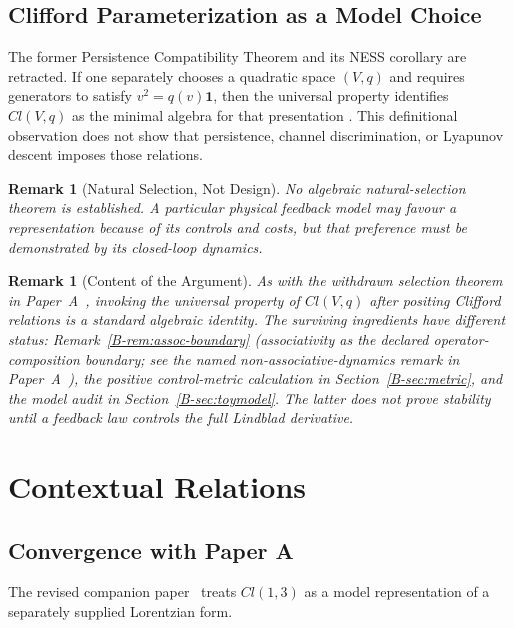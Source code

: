 \documentclass[12pt,a4paper,openany]{book}
\newtheorem{remark}[theorem]{Remark}
\begin{document}
\subsection{Clifford Parameterization as a Model Choice}

The former Persistence Compatibility Theorem and its NESS corollary are retracted.  If one separately chooses a quadratic space $(V,q)$ and requires generators to satisfy $v^2=q(v)\mathbf1$, then the universal property identifies $Cl(V,q)$ as the minimal algebra for that presentation \cite{Hestenes1966}.  This definitional observation does not show that persistence, channel discrimination, or Lyapunov descent imposes those relations.

\begin{remark}[Natural Selection, Not Design]
No algebraic natural-selection theorem is established.  A particular physical feedback model may favour a representation because of its controls and costs, but that preference must be demonstrated by its closed-loop dynamics.
\end{remark}

\begin{remark}[Content of the Argument]
\label{B-rem:scope}
As with the withdrawn selection theorem in Paper~A~\cite{Liu2026QRAIF_A}, invoking the universal property of $Cl(V,q)$ after positing Clifford relations is a standard algebraic identity.
The surviving ingredients have different status:
Remark~\ref{B-rem:assoc-boundary} (associativity as the declared operator-composition boundary; see the named non-associative-dynamics remark in Paper~A~\cite{Liu2026QRAIF_A}),
the positive control-metric calculation in Section~\ref{B-sec:metric}, and the model audit in Section~\ref{B-sec:toymodel}.  The latter does not prove stability until a feedback law controls the full Lindblad derivative.
\end{remark}

\section{Contextual Relations}
\label{B-sec:context}

\subsection{Convergence with Paper A}

The revised companion paper~\cite{Liu2026QRAIF_A} treats $Cl(1,3)$ as a model representation of a separately supplied Lorentzian form.
\end{document}
